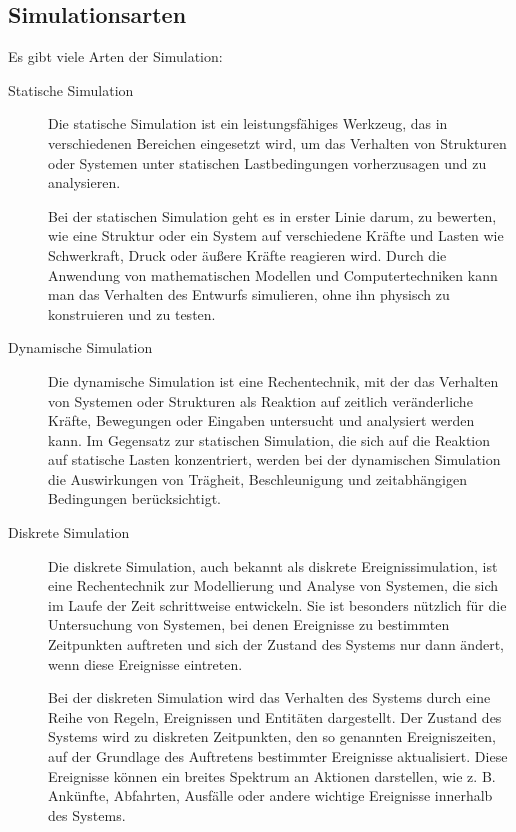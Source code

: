 \subsection{Simulationsarten}
Es gibt viele Arten der Simulation: 
\begin{description}
    \item[Statische Simulation]
    Die statische Simulation ist ein leistungsfähiges Werkzeug, das in verschiedenen Bereichen eingesetzt wird, um das Verhalten von Strukturen oder Systemen unter statischen Lastbedingungen vorherzusagen und zu analysieren.
    
    Bei der statischen Simulation geht es in erster Linie darum, zu bewerten, wie eine Struktur oder ein System auf verschiedene Kräfte und Lasten wie Schwerkraft, Druck oder äußere Kräfte reagieren wird. Durch die Anwendung von mathematischen Modellen und Computertechniken kann man das Verhalten des Entwurfs simulieren, ohne ihn physisch zu konstruieren und zu testen.
    \cite[vgl.][]{statischeSim}

    \item[Dynamische Simulation]
    Die dynamische Simulation ist eine Rechentechnik, mit der das Verhalten von Systemen oder Strukturen als Reaktion auf zeitlich veränderliche Kräfte, Bewegungen oder Eingaben untersucht und analysiert werden kann. Im Gegensatz zur statischen Simulation, die sich auf die Reaktion auf statische Lasten konzentriert, werden bei der dynamischen Simulation die Auswirkungen von Trägheit, Beschleunigung und zeitabhängigen Bedingungen berücksichtigt.
    \cite[vgl.][]{dynamischeSim}
    
    \item[Diskrete Simulation] 
    Die diskrete Simulation, auch bekannt als diskrete Ereignissimulation, ist eine Rechentechnik zur Modellierung und Analyse von Systemen, die sich im Laufe der Zeit schrittweise entwickeln. Sie ist besonders nützlich für die Untersuchung von Systemen, bei denen Ereignisse zu bestimmten Zeitpunkten auftreten und sich der Zustand des Systems nur dann ändert, wenn diese Ereignisse eintreten.

    Bei der diskreten Simulation wird das Verhalten des Systems durch eine Reihe von Regeln, Ereignissen und Entitäten dargestellt. Der Zustand des Systems wird zu diskreten Zeitpunkten, den so genannten Ereigniszeiten, auf der Grundlage des Auftretens bestimmter Ereignisse aktualisiert. Diese Ereignisse können ein breites Spektrum an Aktionen darstellen, wie z. B. Ankünfte, Abfahrten, Ausfälle oder andere wichtige Ereignisse innerhalb des Systems.
    \cite[vgl.][]{mattern-diskrete-simulation}


\end{description}
